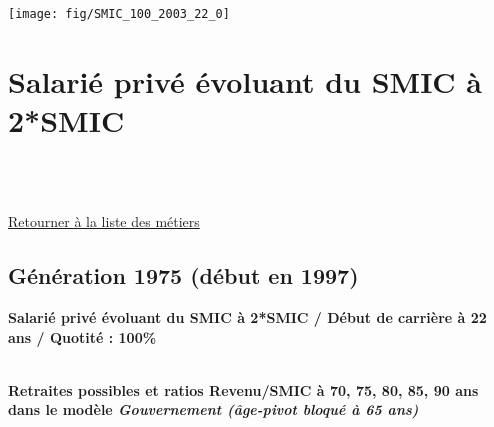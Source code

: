  \vspace{0.1cm} 

 {\hspace{-2.2cm}\texttt{[image: fig/SMIC\_100\_2003\_22\_0]}} 

\newpage 
 
\chapter{Salarié privé évoluant du SMIC à 2*SMIC} 

~\\ 
 


   
 \localtableofcontents 

~\\ 
 
 \hyperlink{page.2}{\noindent Retourner à la liste des métiers}

 \newpage 

\section{Génération 1975 (début en 1997)\label{Ascendant12_100_1975_22_0}} 
 
{\bf \noindent Salarié privé évoluant du SMIC à 2*SMIC / Début de carrière à 22 ans / Quotité : 100\%}  ~ 

 ~\\{\bf \noindent Retraites possibles et ratios Revenu/SMIC à 70, 75, 80, 85, 90 ans dans le modèle \emph{Gouvernement (âge-pivot bloqué à 65 ans)}}  
 
